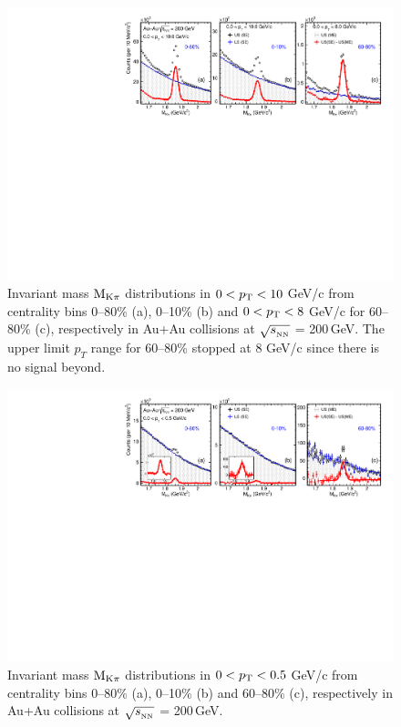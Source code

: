 \documentclass[%
 reprint,	
 amsmath,amssymb,
 aps,
 prc,
]{revtex4-1}
\begin{document}
\begin{figure}
\centering
\includegraphics[width=1.0\textwidth]{fig/signal_0_8_10GeV.pdf}
\caption{Invariant mass $\rm M_{K\pi}$ distributions in $0 < p_{\rm T} < 10$ GeV/c from centrality bins 0--80\% (a), 0--10\% (b) and $0 < p_{\rm T} < 8$ GeV/c for 60--80\% (c), respectively in Au+Au collisions at $\sqrt{s_{_{\rm NN}}}$ = 200\,GeV. The upper limit $p_T$ range for 60--80\% stopped at 8 GeV/c since there is no signal beyond.}
\label{fig:signal_0} 
\end{figure}

\begin{figure}
\centering
\includegraphics[width=1.0\textwidth]{fig/signal2_0_05GeV.pdf}
\caption{Invariant mass $\rm M_{K\pi}$ distributions in $0 < p_{\rm T} < 0.5$ GeV/c from centrality bins 0--80\% (a), 0--10\% (b) and 60--80\% (c), respectively in Au+Au collisions at $\sqrt{s_{_{\rm NN}}}$ = 200\,GeV.}
\label{fig:signal_1} 
\end{figure}
\end{document}
